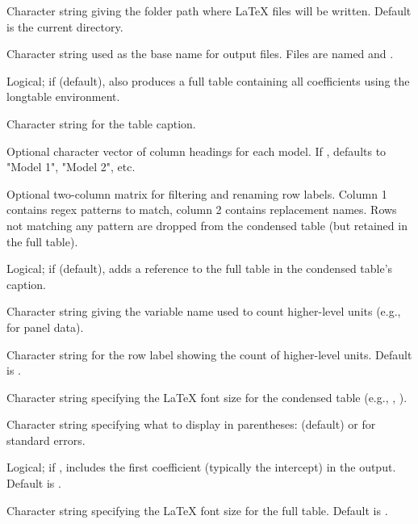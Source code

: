 \documentclass[a4paper]{book}
\begin{document}
\begin{Arguments}
\begin{ldescription}
\item[\code{saveFolder}] Character string giving the folder path where LaTeX files
will be written. Default is the current directory.

\item[\code{nameTag}] Character string used as the base name for output files.
Files are named  and
.

\item[\code{saveFull}] Logical; if  (default), also produces a full table
containing all coefficients using the longtable environment.

\item[\code{tabCaption}] Character string for the table caption.

\item[\code{model.names}] Optional character vector of column headings for each model.
If , defaults to "Model 1", "Model 2", etc.

\item[\code{NameConversionMat}] Optional two-column matrix for filtering and renaming
row labels. Column 1 contains regex patterns to match, column 2 contains
replacement names. Rows not matching any pattern are dropped from the
condensed table (but retained in the full table).

\item[\code{DoFullTableKey}] Logical; if  (default), adds a reference to
the full table in the condensed table's caption.

\item[\code{superunit\_covariateName}] Character string giving the variable name used
to count higher-level units (e.g.,  for panel data).

\item[\code{superunit\_label}] Character string for the row label showing the count
of higher-level units. Default is .

\item[\code{font.size}] Character string specifying the LaTeX font size for the
condensed table (e.g., , ).

\item[\code{inParens}] Character string specifying what to display in parentheses:
 (default) or  for standard errors.

\item[\code{keepCoef1}] Logical; if , includes the first coefficient
(typically the intercept) in the output. Default is .

\item[\code{font.size.full}] Character string specifying the LaTeX font size for
the full table. Default is .
\end{ldescription}
\end{Arguments}
\end{document}

